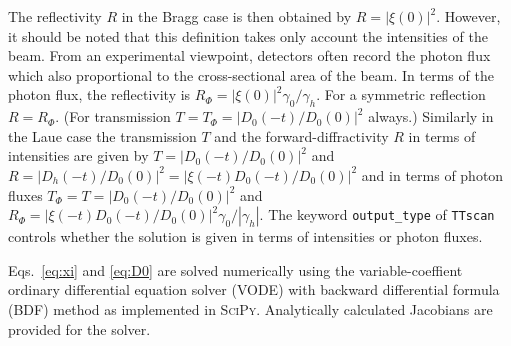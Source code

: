 \documentclass[11pt,a4paper]{article}
\begin{document}
The reflectivity $R$ in the Bragg case is then obtained by $R=|\xi(0)|^2$. However, it should be noted that this definition takes only account the intensities of the beam. From an experimental viewpoint, detectors often record the photon flux which also proportional to the cross-sectional area of the beam. In terms of the photon flux, the reflectivity is $R_\Phi = |\xi(0)|^2 \gamma_0/\gamma_h$. For a symmetric reflection $R=R_\Phi$. (For transmission $T = T_\Phi = |D_0(-t)/D_0(0)|^2$ always.) Similarly in the Laue case the transmission $T$ and the forward-diffractivity $R$ in terms of intensities are given by $T = |D_0(-t)/D_0(0)|^2$ and $R = |D_h(-t)/D_0(0)|^2 = |\xi(-t)D_0(-t)/D_0(0)|^2$ and in terms of photon fluxes $T_\Phi = T = |D_0(-t)/D_0(0)|^2$ and $R_\Phi = |\xi(-t)D_0(-t)/D_0(0)|^2  \gamma_0/|\gamma_h|$. The keyword \texttt{output\_type} of \texttt{TTscan} controls whether the solution is given in terms of intensities or photon fluxes.

Eqs.~\eqref{eq:xi} and \eqref{eq:D0} are solved numerically using the variable-coeffient ordinary differential equation solver (VODE) with backward differential formula (BDF) method \cite{Brown_1989} as implemented in \textsc{SciPy}. Analytically calculated Jacobians are provided for the solver.
\end{document}
